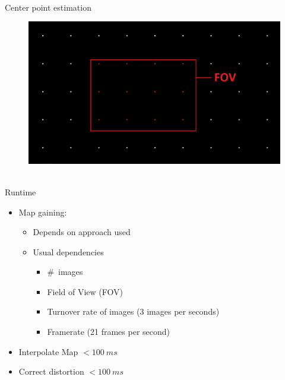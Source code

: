 \documentclass[accentcolor=tud4b,colorbacktitle,inverttitle,landscape,german,presentation,t]{tudbeamer}
\begin{document}
\begin{frame}{\\Center point estimation}

 \begin{figure}
 \vspace{-0.5cm}
 \includegraphics[scale=0.15]{pixelSizeImg2_FOV}
 \end{figure}
\end{frame}






\begin{frame}{\\Runtime}
\begin{itemize}
\item Map gaining:\begin{itemize}
\item Depends on approach used
\item Usual dependencies
\begin{itemize}
\item \#~images
\item Field of View (FOV)
\item Turnover rate of images (3 images per seconds)
\item Framerate (21 frames per second)
\end{itemize}
\end{itemize}
\item Interpolate Map $<100~ms$
\item Correct distortion $<100~ms$
\end{itemize}

\end{frame}
\end{document}
